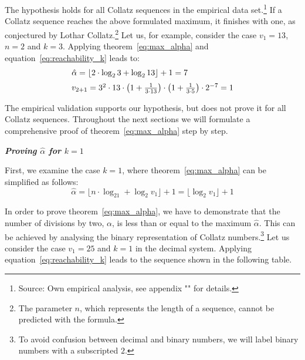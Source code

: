 \documentclass{SciPress_2015}
\renewcommand{\subsection}[1]{\textit{\textbf{#1}}}
\begin{document}
The hypothesis holds for all Collatz sequences in the empirical data set.\footnote{Source: Own empirical analysis, see appendix "" for details.} If a Collatz sequence reaches the above formulated maximum, it finishes with one, as conjectured by Lothar Collatz.\footnote{The parameter $n$, which represents the length of a sequence, cannot be predicted with the formula.} Let us, for example, consider the case $v_1=13$, $n=2$ and $k=3$. Applying theorem~\ref{eq:max_alpha} and equation~\ref{eq:reachability_k} leads to:
\[
\begin{array}{l}
\hat\alpha=\lfloor 2\cdot\log_23+\log_213\rfloor+1=7\\[\medskipamount]
v_{2+1}=3^2\cdot 13\cdot\left(1+\frac{1}{3\cdot13}\right)\cdot\left(1+\frac{1}{3\cdot5}\right)\cdot2^{-7}=1
\end{array}
\]

\par\noindent
The empirical validation supports our hypothesis, but does not prove it for all Collatz sequences. Throughout the next sections we will formulate a comprehensive proof of theorem~\ref{eq:max_alpha} step by step.

\vspace{1em}\noindent
\subsection{Proving \boldmath$\hat\alpha$ for \boldmath$k=1$}
\par\noindent
First, we examine the case $k=1$, where theorem~\ref{eq:max_alpha} can be simplified as follows:
\begin{equation}
\label{eq:max_alpha_1}
\hat\alpha=\lfloor n\cdot\log_21+\log_2v_1\rfloor+1=\lfloor\log_2v_1\rfloor+1
\end{equation}

\par\noindent
In order to prove theorem~\ref{eq:max_alpha}, we have to demonstrate that the number of divisions by two, $\alpha$, is less than or equal to the maximum $\hat\alpha$. This can be achieved by analysing the binary representation of Collatz numbers.\footnote{To avoid confusion between decimal and binary numbers, we will label binary numbers with a subscripted $2$.} Let us consider the case $v_1=25$ and $k=1$ in the decimal system. Applying equation~\ref{eq:reachability_k} leads to the sequence shown in the following table.
\end{document}
